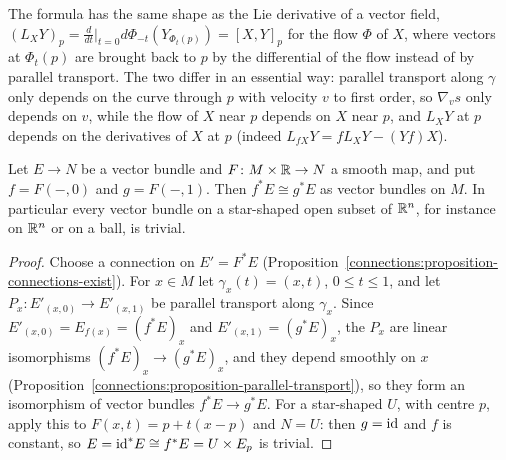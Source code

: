 The formula has the same shape as the Lie derivative of a vector field, $(L_XY)_p = \frac{d}{dt}\big|_{t=0}d\Phi_{-t}(Y_{\Phi_t(p)}) = [X, Y]_p$ for the flow $\Phi$ of $X$, where vectors at $\Phi_t(p)$ are
brought back to $p$ by the differential of the flow instead of by parallel transport. The two differ in an essential way: parallel transport along $\gamma$ only depends on the curve through $p$ with velocity $v$ to first order, so $\nabla_vs$ only depends on $v$,
while the flow of $X$ near $p$ depends on $X$ near $p$, and $L_XY$ at $p$ depends on the derivatives of $X$ at $p$ (indeed $L_{fX}Y = fL_XY - (Yf)X$).

\begin{proposition}\label{connections:proposition-homotopy-invariance}
Let $E \to N$ be a vector bundle and $F \colon M \times \mathbb{R} \to N$ a smooth map, and put $f = F(-, 0)$ and $g = F(-, 1)$. Then $f^*E \cong g^*E$ as vector bundles on $M$. In particular every vector bundle on a star-shaped open
subset of $\mathbb{R}^n$, for instance on $\mathbb{R}^n$ or on a ball, is trivial.
\end{proposition}

\begin{proof}
Choose a connection on $E' = F^*E$ (Proposition~\ref{connections:proposition-connections-exist}). For $x \in M$ let $\gamma_x(t) = (x, t)$, $0 \leq t \leq 1$, and let $P_x \colon E'_{(x,0)} \to E'_{(x,1)}$ be parallel
transport along $\gamma_x$. Since $E'_{(x,0)} = E_{f(x)} = (f^*E)_x$ and $E'_{(x,1)} = (g^*E)_x$, the $P_x$ are linear isomorphisms $(f^*E)_x \to (g^*E)_x$, and they depend smoothly on $x$
(Proposition~\ref{connections:proposition-parallel-transport}), so they form an isomorphism of vector bundles $f^*E \to g^*E$. For a star-shaped $U$, with centre $p$, apply this to $F(x, t) = p + t(x - p)$ and
$N = U$: then $g = \mathrm{id}$ and $f$ is constant, so $E = \mathrm{id}^*E \cong f^*E = U \times E_p$ is trivial.
\end{proof}

